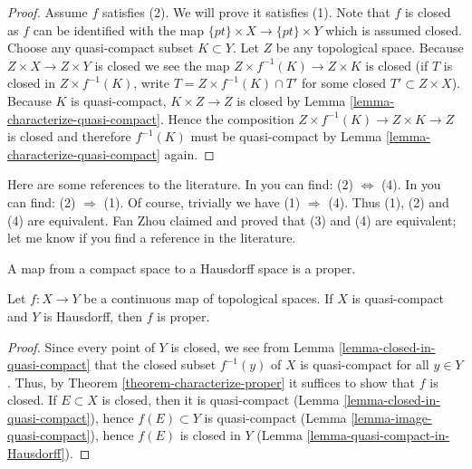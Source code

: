 \begin{proof}
\medskip\noindent
Assume $f$ satisfies (2). We will prove it satisfies (1).
Note that $f$ is closed as $f$ can be identified with the map
$\{pt\} \times X \to \{pt\} \times Y$ which is assumed closed.
Choose any quasi-compact subset $K \subset Y$.
Let $Z$ be any topological space.
Because $Z \times X \to Z \times Y$ is closed
we see the map $Z \times f^{-1}(K) \to Z \times K$
is closed (if $T$ is closed in $Z \times f^{-1}(K)$, write
$T = Z \times f^{-1}(K) \cap T'$ for some closed
$T' \subset Z \times X$). Because $K$ is quasi-compact,
$K \times Z\to Z$ is closed by Lemma \ref{lemma-characterize-quasi-compact}.
Hence the composition $Z \times f^{-1}(K)\to Z \times K \to Z$
is closed and therefore $f^{-1}(K)$ must be quasi-compact
by Lemma \ref{lemma-characterize-quasi-compact} again.
\end{proof}

\begin{remark}
\label{remark-proof-literature}
Here are some references to the literature.
In \cite[I, p. 75, Theorem 1]{Bourbaki} you can find:
(2) $\Leftrightarrow$ (4).
In \cite[I, p. 77, Proposition 6]{Bourbaki} you can find:
(2) $\Rightarrow$ (1).
Of course, trivially we have (1) $\Rightarrow$ (4).
Thus (1), (2) and (4) are equivalent.
Fan Zhou claimed and proved that (3) and (4) are equivalent;
let me know if you find a reference in the literature.
\end{remark}

\begin{lemma}
\label{lemma-closed-map}
\begin{slogan}
A map from a compact space to a Hausdorff space is a proper.
\end{slogan}
Let $f : X \to Y$ be a continuous map of topological spaces.
If $X$ is quasi-compact and $Y$ is Hausdorff, then $f$ is proper.
\end{lemma}

\begin{proof}
Since every point of $Y$ is closed, we see from
Lemma \ref{lemma-closed-in-quasi-compact}
that the closed subset $f^{-1}(y)$ of $X$ is quasi-compact for all $y \in Y$.
Thus, by Theorem \ref{theorem-characterize-proper}
it suffices to show that $f$ is closed.
If $E \subset X$ is closed, then it is quasi-compact
(Lemma \ref{lemma-closed-in-quasi-compact}),
hence $f(E) \subset Y$ is quasi-compact
(Lemma \ref{lemma-image-quasi-compact}),
hence $f(E)$ is closed in $Y$
(Lemma \ref{lemma-quasi-compact-in-Hausdorff}).
\end{proof}

